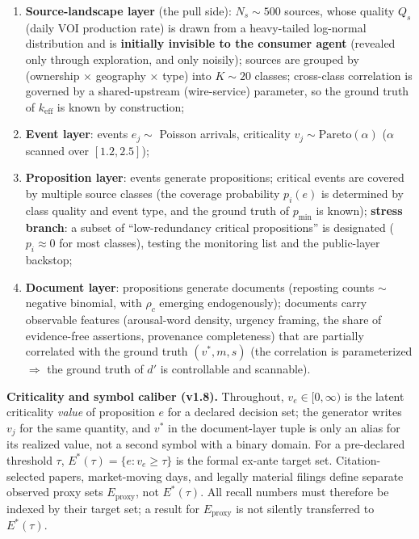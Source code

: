 \documentclass[
  11pt]{article}
\providecommand{\tightlist}{%
  \setlength{\itemsep}{0pt}\setlength{\parskip}{0pt}}
\begin{document}
\begin{enumerate}
\def\labelenumi{\arabic{enumi}.}
\tightlist
\item
  \textbf{Source-landscape layer} (the pull side): \(N_s \sim 500\)
  sources, whose quality \(Q_s\) (daily VOI production rate) is drawn
  from a heavy-tailed log-normal distribution and is \textbf{initially
  invisible to the consumer agent} (revealed only through exploration,
  and only noisily); sources are grouped by (ownership × geography ×
  type) into \(K \sim 20\) classes; cross-class correlation is governed
  by a shared-upstream (wire-service) parameter, so the ground truth of
  \(k_{\mathrm{eff}}\) is known by construction;
\item
  \textbf{Event layer}: events \(e_j \sim\) Poisson arrivals,
  criticality \(v_j \sim \mathrm{Pareto}(\alpha)\) (\(\alpha\) scanned
  over \([1.2, 2.5]\));
\item
  \textbf{Proposition layer}: events generate propositions; critical
  events are covered by multiple source classes (the coverage
  probability \(p_i(e)\) is determined by class quality and event type,
  and the ground truth of \(p_{\min}\) is known); \textbf{stress
  branch}: a subset of ``low-redundancy critical propositions'' is
  designated (\(p_i \approx 0\) for most classes), testing the
  monitoring list and the public-layer backstop;
\item
  \textbf{Document layer}: propositions generate documents (reposting
  counts \(\sim\) negative binomial, with \(\rho_c\) emerging
  endogenously); documents carry observable features (arousal-word
  density, urgency framing, the share of evidence-free assertions,
  provenance completeness) that are partially correlated with the ground
  truth \((v^*, m, s)\) (the correlation is parameterized
  \(\Rightarrow\) the ground truth of \(d'\) is controllable and
  scannable).
\end{enumerate}

\textbf{Criticality and symbol caliber (v1.8).} Throughout,
\(v_e\in[0,\infty)\) is the latent criticality \emph{value} of
proposition \(e\) for a declared decision set; the generator writes
\(v_j\) for the same quantity, and \(v^*\) in the document-layer tuple
is only an alias for its realized value, not a second symbol with a
binary domain. For a pre-declared threshold \(\tau\),
\(E^*(\tau)=\{e:v_e\ge\tau\}\) is the formal ex-ante target set.
Citation-selected papers, market-moving days, and legally material
filings define separate observed proxy sets \(E_{\mathrm{proxy}}\), not
\(E^*(\tau)\). All recall numbers must therefore be indexed by their
target set; a result for \(E_{\mathrm{proxy}}\) is not silently
transferred to \(E^*(\tau)\).
\end{document}
